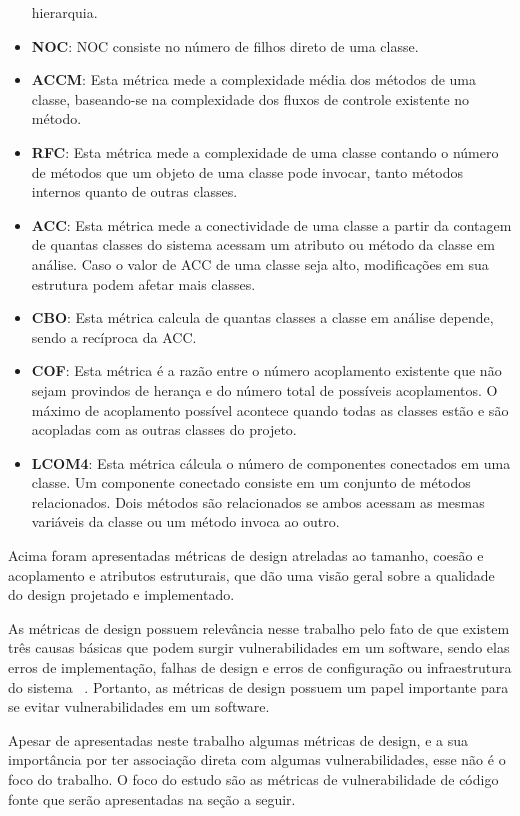 \begin{itemize}
    hierarquia.
  \item \textbf{NOC}: NOC consiste no número de filhos direto de uma classe.
  \item \textbf{ACCM}: Esta métrica mede a complexidade média dos métodos de uma classe, baseando-se na complexidade dos fluxos 
    de controle existente no método.
  \item \textbf{RFC}: Esta métrica mede a complexidade de uma classe contando o número de métodos que um objeto de uma classe 
    pode invocar, tanto métodos internos quanto de outras classes.
  \item \textbf{ACC}: Esta métrica mede a conectividade de uma classe a partir da contagem de quantas classes do sistema 
    acessam um atributo ou método da classe em análise. Caso o valor de ACC de uma classe seja alto, modificações em sua 
    estrutura podem afetar mais classes.
  \item \textbf{CBO}: Esta métrica calcula de quantas classes a classe em análise depende, sendo a recíproca da ACC.
  \item \textbf{COF}: Esta métrica é a razão entre o número acoplamento existente que não sejam provindos de herança e do 
    número total de possíveis acoplamentos. O máximo de acoplamento possível acontece quando todas as classes estão e são 
    acopladas com as outras classes do projeto.
  \item \textbf{LCOM4}: Esta métrica cálcula o número de componentes conectados em uma classe. Um componente conectado consiste 
    em um conjunto de métodos relacionados. Dois métodos são relacionados se ambos acessam as mesmas variáveis da classe ou um 
    método invoca ao outro.
\end{itemize}

Acima foram apresentadas métricas de design atreladas ao tamanho, coesão e acoplamento e atributos estruturais, que dão uma
visão geral sobre a qualidade do design projetado e implementado.

As métricas de design possuem relevância nesse trabalho pelo fato de que existem três causas básicas que podem surgir 
vulnerabilidades em um software, sendo elas erros de implementação, falhas de design e erros de configuração ou infraestrutura
do sistema ~\cite{malerba2010}. Portanto, as métricas de design possuem um papel importante para se evitar vulnerabilidades 
em um software.

Apesar de apresentadas neste trabalho algumas métricas de design, e a sua importância por ter associação direta com algumas 
vulnerabilidades, esse não é o foco do trabalho. O foco do estudo são as métricas de vulnerabilidade de código fonte que serão 
apresentadas na seção a seguir.

